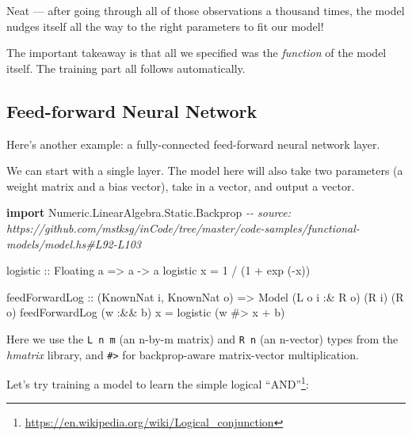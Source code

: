 \documentclass[]{article}
\newenvironment{Shaded}{}{}
\newcommand{\CommentTok}[1]{\textcolor[rgb]{0.38,0.63,0.69}{\textit{#1}}}
\newcommand{\DataTypeTok}[1]{\textcolor[rgb]{0.56,0.13,0.00}{#1}}
\newcommand{\DecValTok}[1]{\textcolor[rgb]{0.25,0.63,0.44}{#1}}
\newcommand{\FunctionTok}[1]{\textcolor[rgb]{0.02,0.16,0.49}{#1}}
\newcommand{\KeywordTok}[1]{\textcolor[rgb]{0.00,0.44,0.13}{\textbf{#1}}}
\newcommand{\NormalTok}[1]{#1}
\newcommand{\OperatorTok}[1]{\textcolor[rgb]{0.40,0.40,0.40}{#1}}
\newcommand{\OtherTok}[1]{\textcolor[rgb]{0.00,0.44,0.13}{#1}}
\renewcommand{\href}[2]{#2\footnote{\url{#1}}}
\begin{document}
Neat --- after going through all of those observations a thousand times, the
model nudges itself all the way to the right parameters to fit our model!

The important takeaway is that all we specified was the \emph{function} of the
model itself. The training part all follows automatically.

\hypertarget{feed-forward-neural-network}{%
\subsection{Feed-forward Neural Network}\label{feed-forward-neural-network}}

Here's another example: a fully-connected feed-forward neural network layer.

We can start with a single layer. The model here will also take two parameters
(a weight matrix and a bias vector), take in a vector, and output a vector.

\begin{Shaded}
\begin{Highlighting}[]
\KeywordTok{import} \DataTypeTok{Numeric.LinearAlgebra.Static.Backprop}
\CommentTok{{-}{-} source: https://github.com/mstksg/inCode/tree/master/code{-}samples/functional{-}models/model.hs\#L92{-}L103}

\OtherTok{logistic ::} \DataTypeTok{Floating}\NormalTok{ a }\OtherTok{=>}\NormalTok{ a }\OtherTok{{-}>}\NormalTok{ a}
\NormalTok{logistic x }\OtherTok{=} \DecValTok{1} \OperatorTok{/}\NormalTok{ (}\DecValTok{1} \OperatorTok{+} \FunctionTok{exp}\NormalTok{ (}\OperatorTok{{-}}\NormalTok{x))}

\NormalTok{feedForwardLog}
\OtherTok{    ::}\NormalTok{ (}\DataTypeTok{KnownNat}\NormalTok{ i, }\DataTypeTok{KnownNat}\NormalTok{ o)}
    \OtherTok{=>} \DataTypeTok{Model}\NormalTok{ (}\DataTypeTok{L}\NormalTok{ o i }\OperatorTok{:\&} \DataTypeTok{R}\NormalTok{ o) (}\DataTypeTok{R}\NormalTok{ i) (}\DataTypeTok{R}\NormalTok{ o)}
\NormalTok{feedForwardLog (w }\OperatorTok{:\&\&}\NormalTok{ b) x }\OtherTok{=}\NormalTok{ logistic (w }\OperatorTok{\#>}\NormalTok{ x }\OperatorTok{+}\NormalTok{ b)}
\end{Highlighting}
\end{Shaded}

Here we use the \texttt{L\ n\ m} (an n-by-m matrix) and \texttt{R\ n} (an
n-vector) types from the \emph{hmatrix} library, and \texttt{\#\textgreater{}}
for backprop-aware matrix-vector multiplication.

Let's try training a model to learn the simple
\href{https://en.wikipedia.org/wiki/Logical_conjunction}{logical ``AND''}:
\end{document}
